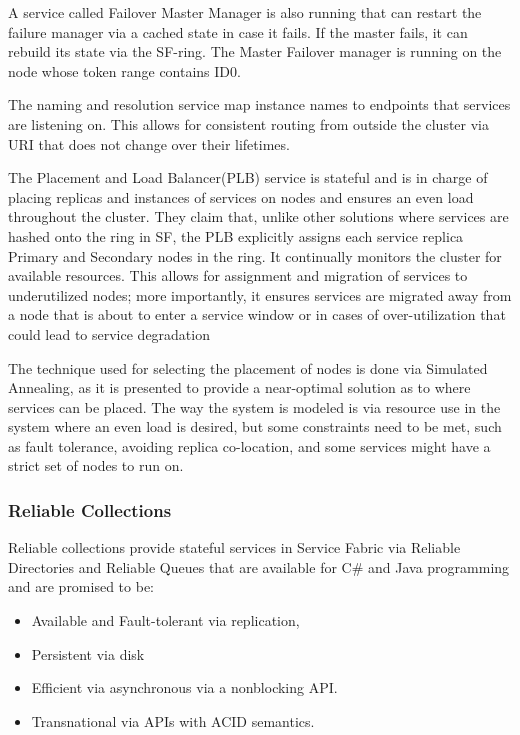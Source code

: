 \documentclass[a4paper,10pt,titlepage]{report}
\begin{document}
    A service called Failover Master Manager is also running that can restart the failure manager via a cached state in case it fails. If the master fails, it can rebuild its state via the SF-ring. The Master Failover manager is running on the node whose token range contains ID0.\\
    \vspace{5mm}

    The naming and resolution service map instance names to endpoints that services are listening on. This allows for consistent routing from outside the cluster via URI that does not change over their lifetimes.\\
    \vspace{5mm}

    The Placement and Load Balancer(PLB) service is stateful and is in charge of placing replicas and instances of services on nodes and ensures an even load throughout the cluster. They claim that, unlike other solutions where services are hashed onto the ring in SF, the PLB explicitly assigns each service replica Primary and Secondary nodes in the ring. It continually monitors the cluster for available resources. This allows for assignment and migration of services to underutilized nodes; more importantly, it ensures services are migrated away from a node that is about to enter a service window or in cases of over-utilization that could lead to service degradation\\
    \vspace{5mm}

    The technique used for selecting the placement of nodes is done via Simulated Annealing, as it is presented to provide a near-optimal solution as to where services can be placed. The way the system is modeled is via resource use in the system where an even load is desired, but some constraints need to be met, such as fault tolerance, avoiding replica co-location, and some services might have a strict set of nodes to run on. \\
    \vspace{5mm}

    \subsubsection{Reliable Collections}

    Reliable collections provide stateful services in Service Fabric via Reliable Directories and Reliable Queues that are available for C\# and Java programming and are promised to be:
    \begin{itemize}
        \item Available and Fault-tolerant via replication,
        \item Persistent via disk
        \item Efficient via asynchronous via a nonblocking API.
        \item Transnational via APIs with ACID semantics.
    \end{itemize}
\end{document}
